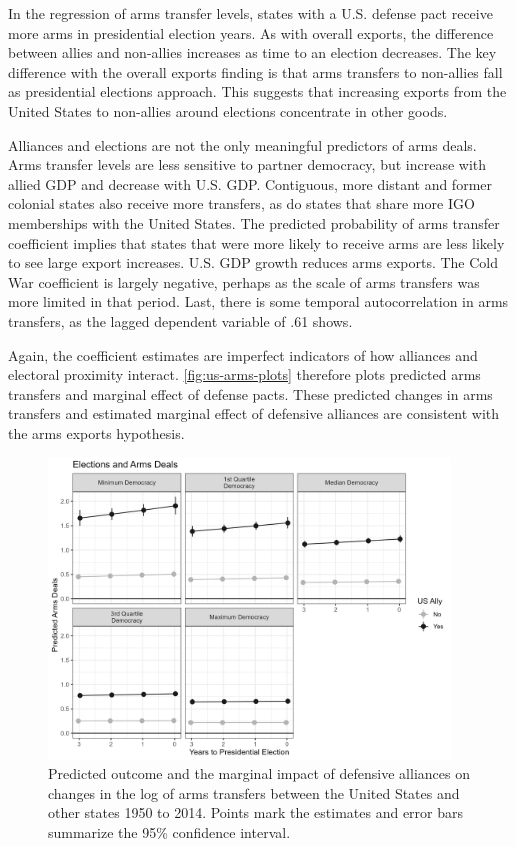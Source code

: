 \documentclass[12pt]{article}
\begin{document}
In the regression of arms transfer levels, states with a U.S. defense pact receive more arms in presidential election years. 
As with overall exports, the difference between allies and non-allies increases as time to an election decreases.
The key difference with the overall exports finding is that arms transfers to non-allies fall as presidential elections approach. 
This suggests that increasing exports from the United States to non-allies around elections concentrate in other goods. 


Alliances and elections are not the only meaningful predictors of arms deals.
Arms transfer levels are less sensitive to partner democracy, but increase with allied GDP and decrease with U.S. GDP. 
Contiguous, more distant and former colonial states also receive more transfers, as do states that share more IGO memberships with the United States.
The predicted probability of arms transfer coefficient implies that states that were more likely to receive arms are less likely to see large export increases.  
U.S. GDP growth reduces arms exports. 
The Cold War coefficient is largely negative, perhaps as the scale of arms transfers was more limited in that period. 
Last, there is some temporal autocorrelation in arms transfers, as the lagged dependent variable of .61 shows.


Again, the coefficient estimates are imperfect indicators of how alliances and electoral proximity interact.
\autoref{fig:us-arms-plots} therefore plots predicted arms transfers and marginal effect of defense pacts.
These predicted changes in arms transfers and estimated marginal effect of defensive alliances are consistent with the arms exports hypothesis.


\begin{figure}[htpb]
	\centering
		\includegraphics[width=0.95\textwidth]{../figures/us-arms-plots.png}
	\caption{Predicted outcome and the marginal impact of defensive alliances on changes in the log of arms transfers between the United States and other states 1950 to 2014. Points mark the estimates and error bars summarize the 95\% confidence interval.}
	\label{fig:us-arms-plots}
\end{figure}
\end{document}
